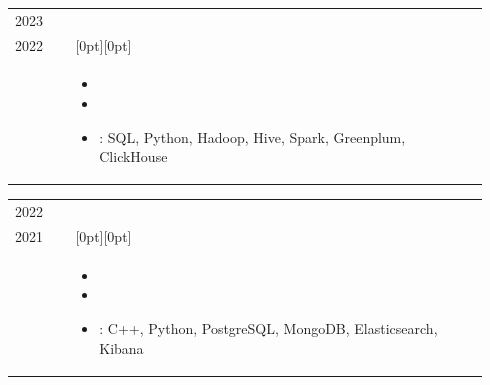 \documentclass[10pt]{article}
\makeatletter
\newif\ifen
\newif\ifru
\newcommand{\en}[1]{\ifen#1\fi}
\newcommand{\ru}[1]{\ifru#1\fi}
\newcommand{\dates}[2]{\footnotesize #2\\[-1pt]\footnotesize #1}
\newcommand{\workentry}[3]{
\begin{tabular}{@{}p{0.125\linewidth}|p{0.82\linewidth}@{}}
\raggedleft #1 & \raisebox{-1.5pt}[0pt][0pt]{\textbf{#2}} \\[-12pt]
& #3
\end{tabular}\vspace{1mm}
}
\makeatother
\begin{document}
\workentry
{\dates{\ru{Август}\en{August} 2022}{\ru{Сентябрь}\en{September} 2023}}
{\ru{Сбер --- Аналитик данных}\en{Sberbank --- Data Analyst}}
{
\begin{itemize}
    \item \ru{Разрабатывал витрины и расчёты для продукта групп связанных заёмщиков: агрегировал кредитную экспозицию, анализировал использование лимитов и состав групп}
          \en{Developed data marts and calculations for a related-borrower group product, aggregated credit exposure, and analyzed limit utilization and group composition}
    \item \ru{Контролировал качество связей между заёмщиками, выявлял дубли и расхождения между источниками, оптимизировал SQL-расчёты на больших данных}
          \en{Controlled borrower relationship data quality, identified duplicates and discrepancies across sources, and optimized SQL calculations on large datasets}
    \item \ru{Стек}\en{Stack}: SQL, Python, Hadoop, Hive, Spark, Greenplum, ClickHouse
\end{itemize}
}

\workentry
{\dates{\ru{Июль}\en{July} 2021}{\ru{Август}\en{August} 2022}}
{\ru{Яндекс Go --- C++ Backend-разработчик}\en{Yandex Go --- C++ Backend Developer}}
{
\begin{itemize}
    \item \ru{Мигрировал базы данных под новые бизнес-сущности и добавил прогресс достижений водителей: переходы на вкладку достижений выросли на 45\%}
          \en{Migrated databases for new business entities and added driver achievement progress tracking, increasing visits to the achievements tab by 45\%}
    \item \ru{Реализовал кеширование и пакетные API-методы, увеличив максимальную пропускную способность в 10 раз без существенной потери актуальности данных}
          \en{Implemented caching and bulk API endpoints, increasing maximum throughput by 10x without significantly reducing data freshness}
    \item \ru{Стек}\en{Stack}: C++, Python, PostgreSQL, MongoDB, Elasticsearch, Kibana
\end{itemize}
}

\vspace{-4mm}
\section{\ru{Навыки}}
\end{document}
